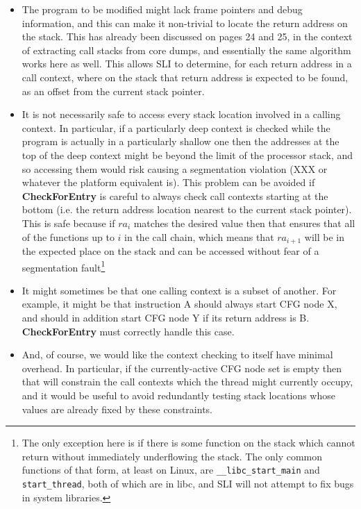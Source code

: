 \begin{itemize}
\item The program to be modified might lack frame pointers and debug
  information, and this can make it non-trivial to locate the return
  address on the stack.  This has already been discussed on pages 24
  and 25, in the context of extracting call stacks from core dumps,
  and essentially the same algorithm works here as well.  This allows
  SLI to determine, for each return address in a call context, where
  on the stack that return address is expected to be found, as an
  offset from the current stack pointer.
\item It is not necessarily safe to access every stack location
  involved in a calling context.  In particular, if a particularly
  deep context is checked while the program is actually in a
  particularly shallow one then the addresses at the top of the deep
  context might be beyond the limit of the processor stack, and so
  accessing them would risk causing a segmentation violation (XXX or
  whatever the platform equivalent is).  This problem can be avoided
  if \textbf{CheckForEntry} is careful to always check call contexts
  starting at the bottom (i.e. the return address location nearest to
  the current stack pointer).  This is safe because if $ra_i$ matches
  the desired value then that ensures that all of the functions up to
  $i$ in the call chain, which means that $ra_{i+1}$ will be in the
  expected place on the stack and can be accessed without fear of a
  segmentation fault\footnote{The only exception here is if there is
    some function on the stack which cannot return without immediately
    underflowing the stack.  The only common functions of that form,
    at least on Linux, are \texttt{\_\_libc\_start\_main} and
    \texttt{start\_thread}, both of which are in libc, and SLI will
    not attempt to fix bugs in system libraries.}

\item It might sometimes be that one calling context is a subset of
  another.  For example, it might be that instruction A should always
  start CFG node X, and should in addition start CFG node Y if its
  return address is B.  \textbf{CheckForEntry} must correctly handle
  this case.
\item And, of course, we would like the context checking to itself
  have minimal overhead.  In particular, if the currently-active CFG
  node set is empty then that will constrain the call contexts which
  the thread might currently occupy, and it would be useful to avoid
  redundantly testing stack locations whose values are already fixed
  by these constraints.
\end{itemize}

